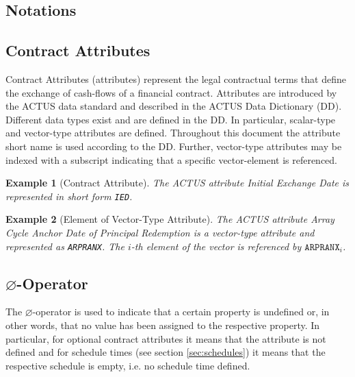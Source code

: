 \documentclass[9pt,oneside]{amsart}
\newtheorem{example}{Example}
\newcommand{\attr}[1]{\texttt{#1}}
\newcommand{\undef}{\varnothing}
\begin{document}
\setlength{\columnsep}{20pt}
\begin{multicols}{2}



\section{Notations}\label{sec:notations}

\subsection{Contract Attributes}\label{sec:attributes}

Contract Attributes (attributes) represent the legal contractual terms that define the exchange of cash-flows of a financial contract. Attributes are introduced by the ACTUS data standard and described in the ACTUS Data Dictionary (DD). Different data types exist and are defined in the DD. In particular, scalar-type and vector-type attributes are defined. Throughout this document the attribute short name is used according to the DD. Further, vector-type attributes may be indexed with a subscript indicating that a specific vector-element is referenced.

\begin{example}[Contract Attribute]
The ACTUS attribute \textit{Initial Exchange Date} is represented in short form \attr{IED}.
\end{example}


\begin{example}[Element of Vector-Type Attribute]
The ACTUS attribute \textit{Array Cycle Anchor Date of Principal Redemption} is a vector-type attribute and represented as \attr{ARPRANX}. The $i$-th element of the vector is referenced by $\attr{ARPRANX}_i$.
\end{example}


\subsection{$\undef$-Operator}\label{sec:undef}

The $\undef$-operator is used to indicate that a certain property is undefined or, in other words, that no value has been assigned to the respective property. In particular, for optional contract attributes it means that the attribute is not defined and for schedule times (see section \ref{sec:schedules}) it means that the respective schedule is empty, i.e. no schedule time defined.


\end{multicols}
\end{document}
